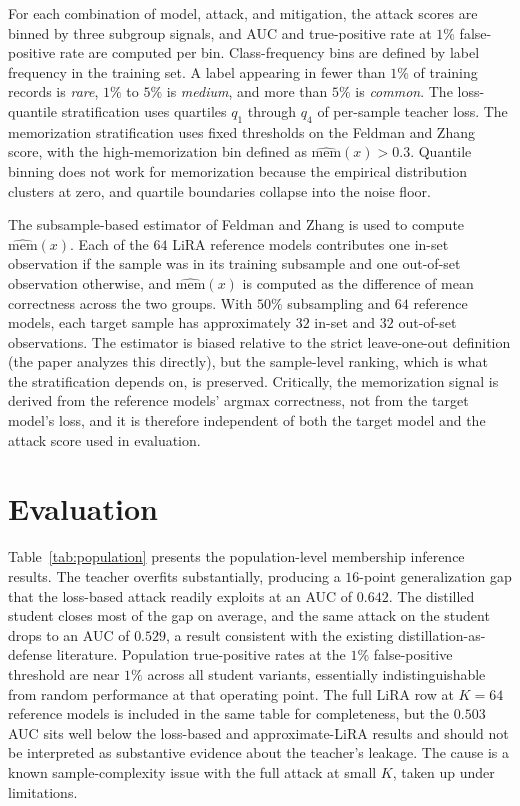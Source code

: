 \documentclass[conference]{IEEEtran}
\begin{document}
For each combination of model, attack, and mitigation, the attack scores are binned by three subgroup signals, and AUC and true-positive rate at $1\%$ false-positive rate are computed per bin. Class-frequency bins are defined by label frequency in the training set. A label appearing in fewer than $1\%$ of training records is \emph{rare}, $1\%$ to $5\%$ is \emph{medium}, and more than $5\%$ is \emph{common}. The loss-quantile stratification uses quartiles $q_1$ through $q_4$ of per-sample teacher loss. The memorization stratification uses fixed thresholds on the Feldman and Zhang score, with the high-memorization bin defined as $\widehat{\mathrm{mem}}(x) > 0.3$. Quantile binning does not work for memorization because the empirical distribution clusters at zero, and quartile boundaries collapse into the noise floor.

The subsample-based estimator of Feldman and Zhang is used to compute $\widehat{\mathrm{mem}}(x)$. Each of the $64$ LiRA reference models contributes one in-set observation if the sample was in its training subsample and one out-of-set observation otherwise, and $\widehat{\mathrm{mem}}(x)$ is computed as the difference of mean correctness across the two groups. With $50\%$ subsampling and $64$ reference models, each target sample has approximately $32$ in-set and $32$ out-of-set observations. The estimator is biased relative to the strict leave-one-out definition (the paper analyzes this directly), but the sample-level ranking, which is what the stratification depends on, is preserved. Critically, the memorization signal is derived from the reference models' argmax correctness, not from the target model's loss, and it is therefore independent of both the target model and the attack score used in evaluation.

\section*{Evaluation}

Table~\ref{tab:population} presents the population-level membership inference results. The teacher overfits substantially, producing a $16$-point generalization gap that the loss-based attack readily exploits at an AUC of $0.642$. The distilled student closes most of the gap on average, and the same attack on the student drops to an AUC of $0.529$, a result consistent with the existing distillation-as-defense literature. Population true-positive rates at the $1\%$ false-positive threshold are near $1\%$ across all student variants, essentially indistinguishable from random performance at that operating point. The full LiRA row at $K = 64$ reference models is included in the same table for completeness, but the $0.503$ AUC sits well below the loss-based and approximate-LiRA results and should not be interpreted as substantive evidence about the teacher's leakage. The cause is a known sample-complexity issue with the full attack at small $K$, taken up under limitations.
\end{document}
